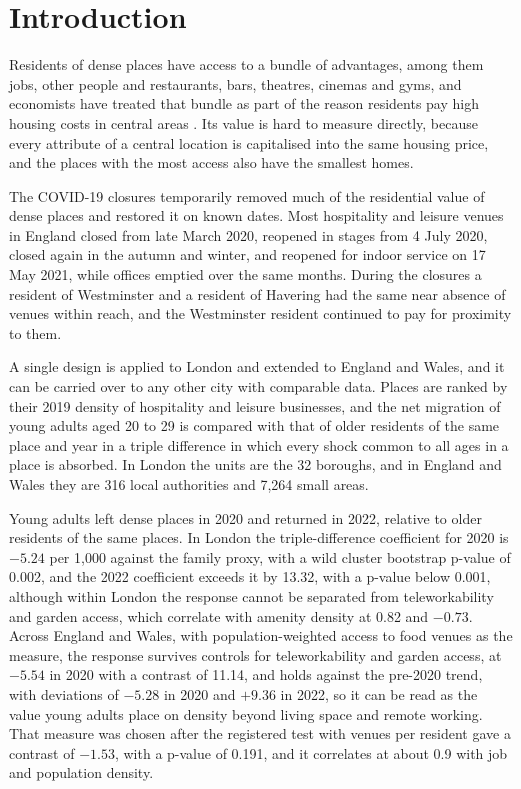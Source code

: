 \documentclass[11pt,a4paper]{article}
\begin{document}
\tableofcontents
\clearpage
{}

\section{Introduction}

Residents of dense places have access to a bundle of advantages, among them jobs, other people and restaurants, bars, theatres, cinemas and gyms, and economists have treated that bundle as part of the reason residents pay high housing costs in central areas \citep{glaeser2001,couture2016}. Its value is hard to measure directly, because every attribute of a central location is capitalised into the same housing price, and the places with the most access also have the smallest homes.

The COVID-19 closures temporarily removed much of the residential value of dense places and restored it on known dates. Most hospitality and leisure venues in England closed from late March 2020, reopened in stages from 4 July 2020, closed again in the autumn and winter, and reopened for indoor service on 17 May 2021, while offices emptied over the same months. During the closures a resident of Westminster and a resident of Havering had the same near absence of venues within reach, and the Westminster resident continued to pay for proximity to them.

A single design is applied to London and extended to England and Wales, and it can be carried over to any other city with comparable data. Places are ranked by their 2019 density of hospitality and leisure businesses, and the net migration of young adults aged 20 to 29 is compared with that of older residents of the same place and year in a triple difference in which every shock common to all ages in a place is absorbed. In London the units are the 32 boroughs, and in England and Wales they are 316 local authorities and 7,264 small areas.

Young adults left dense places in 2020 and returned in 2022, relative to older residents of the same places. In London the triple-difference coefficient for 2020 is $-5.24$ per 1,000 against the family proxy, with a wild cluster bootstrap p-value of 0.002, and the 2022 coefficient exceeds it by 13.32, with a p-value below 0.001, although within London the response cannot be separated from teleworkability and garden access, which correlate with amenity density at 0.82 and $-0.73$. Across England and Wales, with population-weighted access to food venues as the measure, the response survives controls for teleworkability and garden access, at $-5.54$ in 2020 with a contrast of 11.14, and holds against the pre-2020 trend, with deviations of $-5.28$ in 2020 and $+9.36$ in 2022, so it can be read as the value young adults place on density beyond living space and remote working. That measure was chosen after the registered test with venues per resident gave a contrast of $-1.53$, with a p-value of 0.191, and it correlates at about 0.9 with job and population density.
\end{document}
